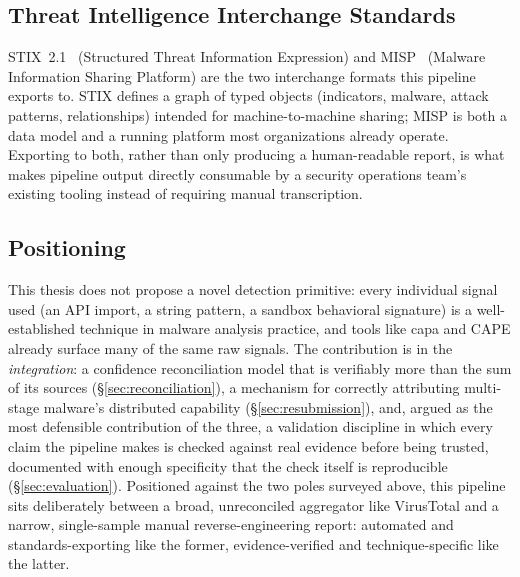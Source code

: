 \subsection{Threat Intelligence Interchange Standards}

STIX~2.1~\cite{stix21} (Structured Threat Information Expression) and
MISP~\cite{misp} (Malware Information Sharing Platform) are the two
interchange formats this pipeline exports to. STIX defines a graph of
typed objects (indicators, malware, attack patterns, relationships)
intended for machine-to-machine sharing; MISP is both a data model and
a running platform most organizations already operate. Exporting to
both, rather than only producing a human-readable report, is what
makes pipeline output directly consumable by a security operations
team's existing tooling instead of requiring manual transcription.

\subsection{Positioning}

This thesis does not propose a novel detection primitive: every
individual signal used (an API import, a string pattern, a sandbox
behavioral signature) is a well-established technique in malware
analysis practice, and tools like capa and CAPE already surface many
of the same raw signals. The contribution is in the
\emph{integration}: a confidence reconciliation model that is
verifiably more than the sum of its sources (\S\ref{sec:reconciliation}),
a mechanism for correctly attributing multi-stage malware's distributed
capability (\S\ref{sec:resubmission}), and, argued as the most
defensible contribution of the three, a validation discipline in which
every claim the pipeline makes is checked against real evidence before
being trusted, documented with enough specificity that the check itself
is reproducible (\S\ref{sec:evaluation}). Positioned against the two
poles surveyed above, this pipeline sits deliberately between a
broad, unreconciled aggregator like VirusTotal and a narrow,
single-sample manual reverse-engineering report: automated and
standards-exporting like the former, evidence-verified and
technique-specific like the latter.
